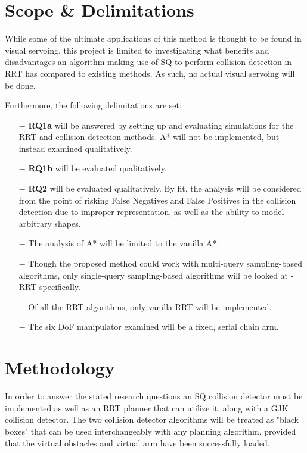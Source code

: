 \section{Scope \& Delimitations}

While some of the ultimate applications of this method is thought to be found in visual servoing, this project is limited to investigating what benefits and disadvantages an algorithm making use of \gls{SQ} to perform collision detection in \gls{RRT} has compared to existing methods. As such, no actual visual servoing will be done. 

Furthermore, the following delimitations are set:
\begin{enumerate}
	\item[$-$] \textbf{RQ1a} will be answered by setting up and evaluating simulations for the \gls{RRT} and collision detection methods. A* will not be implemented, but instead examined qualitatively.
	\item[$-$] \textbf{RQ1b} will be evaluated qualitatively.
	\item[$-$] \textbf{RQ2} will be evaluated qualitatively. By fit, the analysis will be considered from the point of risking False Negatives and False Positives in the collision detection due to improper representation, as well as the ability to model arbitrary shapes. 
	\item[$-$] The analysis of A* will be limited to the vanilla A*.
	\item[$-$] Though the proposed method could work with multi-query sampling-based algorithms, only single-query sampling-based algorithms will be looked at - \gls{RRT} specifically.
	\item[$-$] Of all the \gls{RRT} algorithms, only vanilla \gls{RRT} will be implemented.
	\item[$-$] The six \gls{DoF} manipulator examined will be a fixed, serial chain arm.
\end{enumerate}


\section{Methodology} 

In order to answer the stated research questions an \gls{SQ} collision detector must be implemented as well as an RRT planner that can utilize it, along with a \gls{GJK} collision detector. The two collision detector algorithms will be treated as "black boxes" that can be used interchangeably with any planning algorithm, provided that the virtual obstacles and virtual arm have been successfully loaded.

